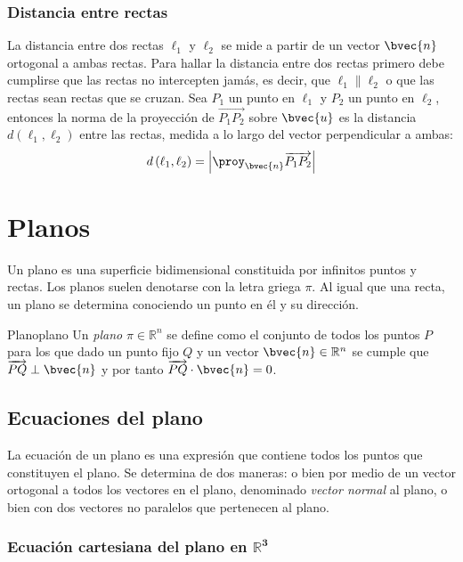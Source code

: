 \documentclass{fmbnotes}
\begin{document}
\subsubsection{ Distancia entre rectas}
La distancia entre dos rectas \( \ell_{1} \) y \( \ell_{2} \) se mide a partir de un vector \( \bvec{n} \) ortogonal a ambas rectas. Para hallar la distancia entre dos rectas primero debe cumplirse que las rectas no intercepten jamás, es decir, que \( \ell_{1} \parallel \ell_{2}  \) o que las rectas sean rectas que se cruzan. Sea \( P_1 \) un punto en \( \ell_{1} \) y \( P_2 \) un punto en \( \ell_{2} \), entonces la norma de la proyección de \( \overrightarrow{P_1 P_2} \) sobre \( \bvec{u} \) es la distancia \( d\left(\ell_{1}, \ell_{2}\right) \) entre las rectas, medida a lo largo del vector perpendicular a ambas:
\[ d\left(\ell_{1}, \ell_{2}\right)=\left|\proy_{\bvec{n}} \overrightarrow{P_1 P_2}\right| \]

\section{Planos}

Un plano es una superficie bidimensional constituida por infinitos puntos y rectas. Los planos suelen denotarse con la letra griega \(\pi\). Al igual que una recta, un plano se determina conociendo un punto en él y su dirección.

\begin{definicion}{Plano}{plano}
	Un \emph{plano} \( \pi \in \mathbb{R}^{n} \) se define como el conjunto de todos los puntos \( P \) para los que dado un punto fijo \( Q \) y un vector \( \bvec{n} \in \mathbb{R}^{n} \) se cumple que \( \overrightarrow{P Q} \perp \bvec{n} \) y por tanto \( \overrightarrow{P Q} \cdot \bvec{n}=0 \).
\end{definicion}

\subsection{Ecuaciones del plano}

La ecuación de un plano es una expresión que contiene todos los puntos que constituyen el plano. Se determina de dos maneras: o bien por medio de un vector ortogonal a todos los vectores en el plano, denominado \emph{vector normal} al plano, o bien con dos vectores no paralelos que pertenecen al plano.

\subsubsection[Ecuación cartesiana del plano en \(\mathbb{R}^{3}\)]{Ecuación cartesiana del plano en \(\bm{\mathbb{R}^{3}}\)}
\end{document}
